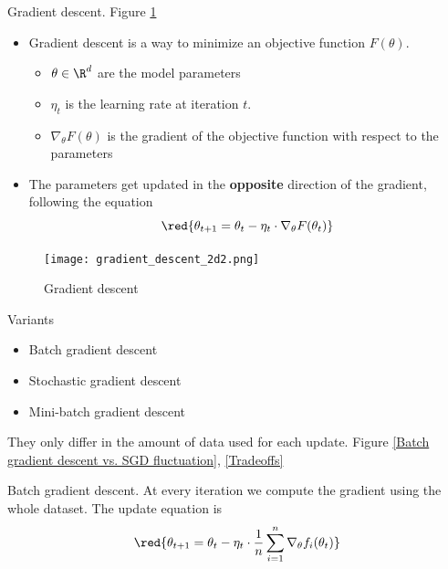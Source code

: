 \documentclass[english]{article}
\begin{document}

\item {Gradient descent}. Figure \ref{Gradient descent}
\begin{itemize}
\item Gradient descent is a way to minimize an objective function $F(\theta)$. 
\begin{itemize}
\item $\theta \in \R^d$ are the model parameters
\item $\eta_t$ is the learning rate at iteration $t$.
\item $\nabla_\theta F(\theta)$ is the gradient of the objective function with respect to the parameters 
\end{itemize}

\item The parameters get updated in the \textbf{opposite} direction of the gradient, following the equation $$\red{\theta_{t+1} = \theta_t - \eta_t \cdot \nabla_\theta F(\theta_t)}$$
 

\end{itemize}

\begin{figure}
\begin{center}
\texttt{[image: gradient\_descent\_2d2.png]}
    \caption{Gradient descent}
    \label{Gradient descent}
\end{center}
\end{figure}






\item {Variants}
\begin{itemize}
\item Batch gradient descent 
\item Stochastic gradient descent 
\item Mini-batch gradient descent
\end{itemize}


They only differ in the amount of data used for each update. Figure \ref{Batch gradient descent vs. SGD fluctuation}, \ref{Tradeoffs}






\item {Batch gradient descent}.
At every iteration we compute the gradient using the whole dataset. The update equation is
$$\red{\theta_{t+1} = \theta_t - \eta_t \cdot \frac1n \sum_{i=1}^n \nabla_\theta f_i(\theta_t)}$$
\end{document}
